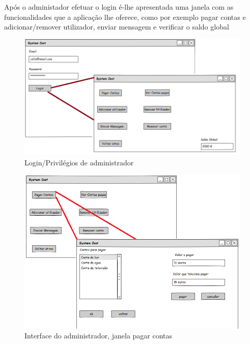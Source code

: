 \newpage
Após o administador efetuar o login é-lhe apresentada uma janela com as funcionalidades que a aplicação lhe oferece, como por exemplo pagar contas e adicionar/remover utilizador, enviar mensagem e verificar o saldo global

\begin{figure}[h!]
	\centering
	\includegraphics[scale=0.5]{imagens/mockups/loginadmin}  
	\caption{Login/Privilégios de administrador }  
\end{figure}


\begin{figure}[h!]
	\centering
	\includegraphics[scale=0.6]{imagens/mockups/AdminpagarContas}  
	\caption{Interface do administrador, janela pagar contas }  
\end{figure}










